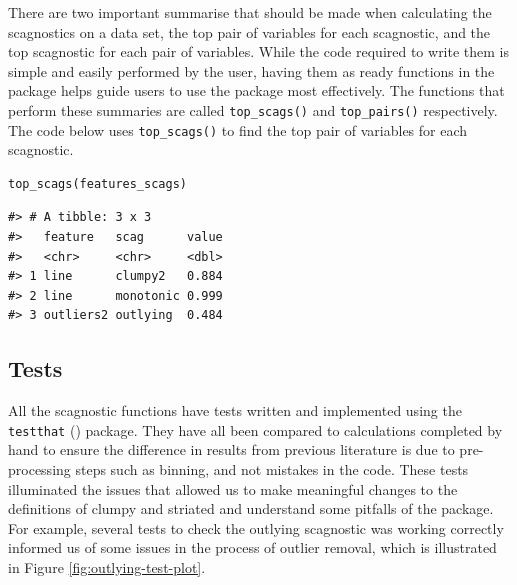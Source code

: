 There are two important summarise that should be made when calculating the scagnostics on a data set, the top pair of variables for each scagnostic, and the top scagnostic for each pair of variables. While the code required to write them is simple and easily performed by the user, having them as ready functions in the package helps guide users to use the package most effectively. The functions that perform these summaries are called \texttt{top\_scags()} and \texttt{top\_pairs()} respectively. The code below uses \texttt{top\_scags()} to find the top pair of variables for each scagnostic.

\begin{verbatim}
top_scags(features_scags)
\end{verbatim}

\begin{verbatim}
#> # A tibble: 3 x 3
#>   feature   scag      value
#>   <chr>     <chr>     <dbl>
#> 1 line      clumpy2   0.884
#> 2 line      monotonic 0.999
#> 3 outliers2 outlying  0.484
\end{verbatim}

\subsection{Tests}\label{tests}

All the scagnostic functions have tests written and implemented using the \texttt{testthat} (\citet{testthat}) package. They have all been compared to calculations completed by hand to ensure the difference in results from previous literature is due to pre-processing steps such as binning, and not mistakes in the code. These tests illuminated the issues that allowed us to make meaningful changes to the definitions of clumpy and striated and understand some pitfalls of the package. For example, several tests to check the outlying scagnostic was working correctly informed us of some issues in the process of outlier removal, which is illustrated in Figure \ref{fig:outlying-test-plot}.

